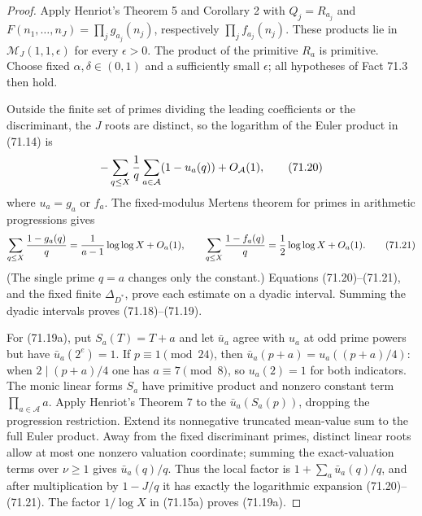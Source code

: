 \documentclass[10pt,reqno]{amsart}
\theoremstyle{definition}
\newcommand{\1}{\mathbf 1}
\begin{document}
\begin{proof} Apply Henriot's Theorem 5 and Corollary 2 with
$Q_j=R_{a_j}$ and
$F(n_1,\ldots,n_J)=\prod_jg_{a_j}(n_j)$, respectively
$\prod_jf_{a_j}(n_j)$.  These products lie in
$\mathcal M_J(1,1,\epsilon)$ for every $\epsilon>0$.  The product
of the primitive $R_a$ is primitive.  Choose fixed
$\alpha,\delta\in(0,1)$ and a sufficiently small $\epsilon$; all
hypotheses of Fact 71.3 then hold.

Outside the finite set of primes dividing the leading coefficients or the
discriminant, the $J$ roots are distinct, so the logarithm of the Euler
product in (71.14) is
\begin{equation}
 -\sum_{q\leq X}{1\over q}
       \sum_{a\in\mathcal A}(1-u_a(q))+O_\mathcal A(1),       \tag{71.20}
\end{equation}
where $u_a=g_a$ or $f_a$.  The fixed-modulus Mertens theorem
for primes in arithmetic progressions gives
\begin{equation}
 \sum_{q\leq X}{1-g_a(q)\over q}
       ={1\over a-1}\log\log X+O_a(1),\qquad
 \sum_{q\leq X}{1-f_a(q)\over q}
       ={1\over2}\log\log X+O_a(1).                      \tag{71.21}
\end{equation}
(The single prime $q=a$ changes only the constant.)  Equations
(71.20)--(71.21), and the fixed finite $\Delta_{D^*}$, prove each
estimate on a dyadic interval.  Summing the dyadic intervals proves
(71.18)--(71.19).

For (71.19a), put $S_a(T)=T+a$ and let $\bar u_a$ agree with $u_a$ at
odd prime powers but have $\bar u_a(2^e)=1$.  If
$p\equiv1\pmod {24}$, then
$\bar u_a(p+a)=u_a((p+a)/4)$: when $2\mid(p+a)/4$ one has
$a\equiv7\pmod8$, so $u_a(2)=1$ for both indicators.  The monic linear
forms $S_a$ have primitive product and nonzero constant term
$\prod_{a\in\mathcal A}a$.  Apply Henriot's Theorem 7 to the
$\bar u_a(S_a(p))$, dropping the progression restriction.  Extend its
nonnegative truncated mean-value sum to the full Euler product.  Away from
the fixed discriminant primes, distinct linear roots allow at most one
nonzero valuation coordinate; summing the exact-valuation terms over
$\nu\geq1$ gives $\bar u_a(q)/q$.  Thus the local factor is
$1+\sum_a\bar u_a(q)/q$, and after multiplication by
$1-J/q$ it has exactly the logarithmic expansion (71.20)--(71.21).
The factor $1/\log X$ in (71.15a) proves (71.19a).
\end{proof}
\end{document}
